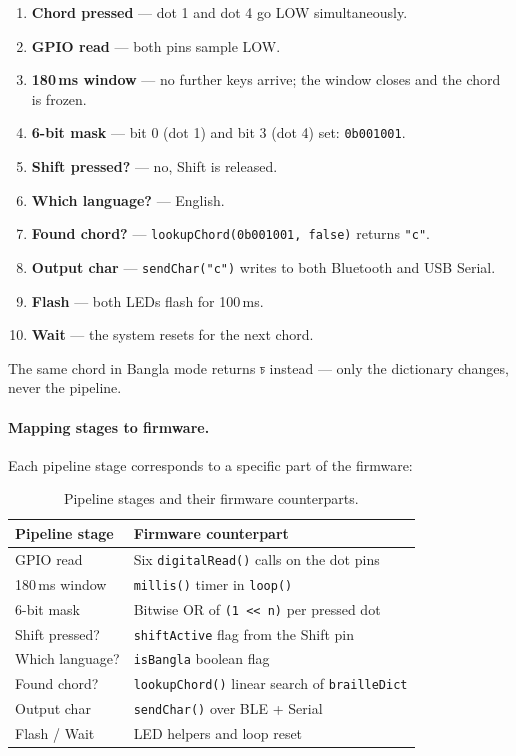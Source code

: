 \documentclass[11pt,a4paper,twoside]{article}
\begin{document}
\begin{enumerate}[nosep]
  \item \textbf{Chord pressed} --- dot 1 and dot 4 go LOW simultaneously.
  \item \textbf{GPIO read} --- both pins sample LOW.
  \item \textbf{180\,ms window} --- no further keys arrive; the window
    closes and the chord is frozen.
  \item \textbf{6-bit mask} --- bit 0 (dot 1) and bit 3 (dot 4) set:
    \texttt{0b001001}.
  \item \textbf{Shift pressed?} --- no, Shift is released.
  \item \textbf{Which language?} --- English.
  \item \textbf{Found chord?} --- \texttt{lookupChord(0b001001, false)}
    returns \texttt{"c"}.
  \item \textbf{Output char} --- \texttt{sendChar("c")} writes to both
    Bluetooth and USB Serial.
  \item \textbf{Flash} --- both LEDs flash for 100\,ms.
  \item \textbf{Wait} --- the system resets for the next chord.
\end{enumerate}

The same chord in Bangla mode returns \texttt{চ} instead --- only the
dictionary changes, never the pipeline.

\paragraph{Mapping stages to firmware.}
Each pipeline stage corresponds to a specific part of the firmware:

\begin{table}[H]\centering
\caption{Pipeline stages and their firmware counterparts.}\label{tab:pipeline-map}
\begin{tabular}{p{3.2cm} p{8cm}}\toprule
\textbf{Pipeline stage} & \textbf{Firmware counterpart} \\\midrule
GPIO read & Six \texttt{digitalRead()} calls on the dot pins \\
180\,ms window & \texttt{millis()} timer in \texttt{loop()} \\
6-bit mask & Bitwise OR of \texttt{(1 << n)} per pressed dot \\
Shift pressed? & \texttt{shiftActive} flag from the Shift pin \\
Which language? & \texttt{isBangla} boolean flag \\
Found chord? & \texttt{lookupChord()} linear search of \texttt{brailleDict} \\
Output char & \texttt{sendChar()} over BLE + Serial \\
Flash / Wait & LED helpers and loop reset \\\bottomrule
\end{tabular}\end{table}
\end{document}
